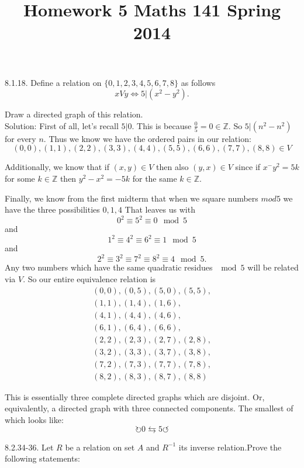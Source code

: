 \documentclass[10 pt]{amsart}
\theoremstyle{definition}
\theoremstyle{remark}
\numberwithin{equation}{subsection}
\newcommand{\Z}{\mathbb{Z}}
\begin{document}
\title{Homework 5 Maths 141 Spring 2014}
\maketitle 

8.1.18. Define a relation on $\{0,1,2,3,4,5,6,7,8\}$ as follows
\[
xVy \Longleftrightarrow 5|(x^2-y^2).
\]

Draw a directed graph of this relation.\\


Solution:  First of all, let's recall $5|0$.  This is because $\frac{0}{5}=0\in\Z$.
So $5|(n^2-n^2)$ for every $n$.  Thus we know we have the ordered pairs in our relation:\\
\[
(0,0),(1,1),(2,2),(3,3),(4,4),(5,5),(6,6),(7,7),(8,8)\in V
\]

Additionally, we know that if $(x,y)\in V$ then also $(y,x)\in V$ since if $x^-y^2 = 5k$ for some $k\in \Z$ then $y^2-x^2 = -5k$ for the same $k\in\Z$.

Finally, we know from the first midterm that when we square numbers $mod 5$ we have the three possibilities $0,1,4$  That leaves us with
\[
0^2 \equiv 5^2 \equiv 0 \mod{5}
\] 
and
\[
1^2 \equiv 4^2 \equiv 6^2 \equiv 1 \mod{5}
\]
and
\[
2^2\equiv 3^2 \equiv 7^2 \equiv 8^2 \equiv 4 \mod{5}.
\]
Any two numbers which have the same quadratic residues $\mod{5}$ will be related via $V$.  So our entire equivalence relation is
\begin{eqnarray*}
(0,0),(0,5),(5,0),(5,5),\\
(1,1),(1,4),(1,6),\\
(4,1),(4,4),(4,6),\\
(6,1),(6,4),(6,6),\\
(2,2),(2,3),(2,7),(2,8),\\
(3,2),(3,3),(3,7),(3,8),\\
(7,2),(7,3),(7,7),(7,8),\\
(8,2),(8,3),(8,7),(8,8)
\end{eqnarray*}


This is essentially three complete directed graphs which are disjoint.  Or, equivalently, a directed graph with three connected components. The smallest of which looks like:
\[
\circlearrowright 0 \leftrightarrows 5 \circlearrowleft
\]

\newpage

8.2.34-36. Let $R$ be a relation on set $A$ and $R^{-1}$ its inverse relation.Prove the following statements:\\
\end{document}
